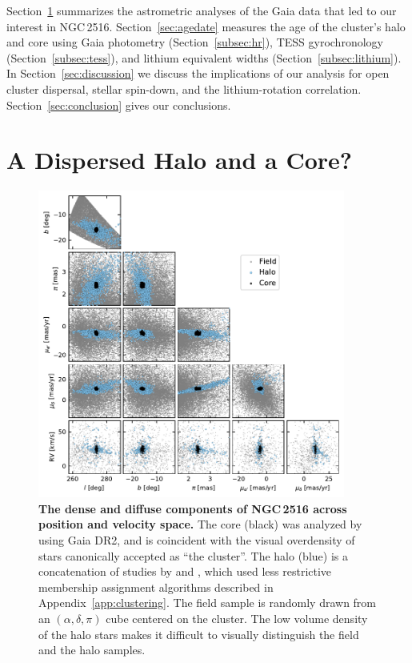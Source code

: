 \documentclass[12pt,twocolumn,tighten]{aastex63}
\newcommand{\cn}{NGC\,2516} %
\begin{document}
Section~\ref{sec:gaia} summarizes the astrometric analyses of the Gaia
data that led to our interest in \cn.  Section~\ref{sec:agedate}
measures the age of the cluster's halo and core using Gaia photometry
(Section~\ref{subsec:hr}), TESS gyrochronology
(Section~\ref{subsec:tess}), and lithium equivalent widths
(Section~\ref{subsec:lithium}).  In Section~\ref{sec:discussion} we
discuss the implications of our analysis for open cluster dispersal,
stellar spin-down, and the lithium-rotation correlation.  Section~\ref{sec:conclusion}
gives our conclusions.


\section{A Dispersed Halo and a Core?}
\label{sec:gaia}

\begin{figure}[t]
	\begin{center}
		\leavevmode
		\includegraphics[width=0.9\textwidth]{f1.pdf}
	\end{center}
	\vspace{-0.7cm}
  \caption{ {\bf The dense and diffuse components of NGC\,2516 across
  position and velocity space.} The core (black) was analyzed by
  \citet{cantatgaudin_gaia_2018} using Gaia DR2, and is coincident
  with the visual overdensity of stars canonically accepted as ``the
  cluster''.  The halo (blue) is a concatenation of studies by
  \citet{kounkel_untangling_2019} and \citet{meingast_2021}, which
  used less restrictive membership assignment algorithms described in
  Appendix~\ref{app:clustering}.  The field sample is randomly drawn
  from an $(\alpha, \delta, \pi)$ cube centered on the cluster.  The
  low volume density of the halo stars makes it difficult to visually
  distinguish the field and the halo samples.
  \label{fig:gaia6d}
	}
\end{figure}
\end{document}
